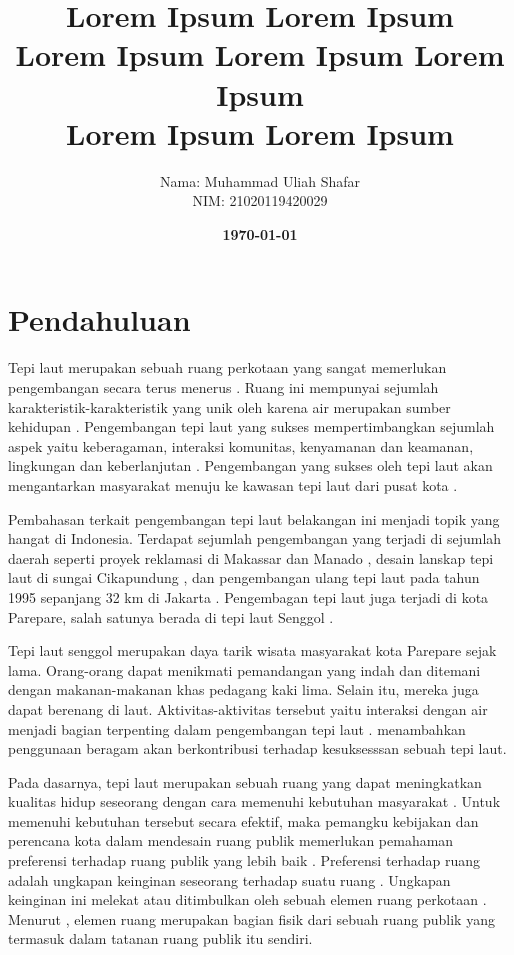 \documentclass[11pt]{simartadv} %
\title{
\textbf{Lorem Ipsum Lorem Ipsum \\
Lorem Ipsum Lorem Ipsum Lorem Ipsum} \\
\textbf{{Lorem Ipsum Lorem Ipsum \\}}
} %
\date{\textbf{\today}}
\author{
\begin{tabular}{@{}ll@{}}
	Nama & : Muhammad Uliah Shafar\\
	NIM & : 21020119420029\\
\end{tabular}
}
\begin{document}
\section{Pendahuluan}

Tepi laut merupakan sebuah ruang perkotaan yang sangat memerlukan pengembangan secara terus menerus \citep{shamsuddin2013}. Ruang ini mempunyai sejumlah karakteristik-karakteristik yang unik oleh karena air merupakan sumber kehidupan \citep{yassin2010}. Pengembangan tepi laut yang sukses mempertimbangkan sejumlah aspek yaitu keberagaman, interaksi komunitas, kenyamanan dan keamanan, lingkungan dan keberlanjutan \citep{hussein2014}. Pengembangan yang sukses oleh tepi laut akan mengantarkan masyarakat menuju ke kawasan tepi laut dari pusat kota \citep{hoyle2001}.

Pembahasan terkait pengembangan tepi laut belakangan ini menjadi topik yang hangat di Indonesia. Terdapat sejumlah pengembangan yang terjadi di sejumlah daerah seperti proyek reklamasi di Makassar dan Manado \citep{andi2017,fhuh2017,tungka2012}, desain lanskap tepi laut di sungai Cikapundung \citep{ainy2016}, dan pengembangan ulang tepi laut pada tahun 1995 sepanjang 32 km di Jakarta \citep{pramesti2017}. 
Pengembagan tepi laut juga terjadi di kota Parepare, salah satunya berada di tepi laut Senggol \citep{tri2020}.

Tepi laut senggol merupakan daya tarik wisata masyarakat kota Parepare sejak lama. Orang-orang dapat menikmati pemandangan yang indah dan ditemani dengan makanan-makanan khas pedagang kaki lima. Selain itu, mereka juga dapat berenang di laut. Aktivitas-aktivitas tersebut yaitu interaksi dengan air menjadi bagian terpenting dalam pengembangan tepi laut \citep{davidowich1998}. \cite{eldeeb2015} menambahkan penggunaan beragam akan berkontribusi terhadap kesuksesssan sebuah tepi laut.

Pada dasarnya, tepi laut merupakan sebuah ruang yang dapat meningkatkan kualitas hidup seseorang dengan cara memenuhi kebutuhan masyarakat \citep{kim2012}.
Untuk memenuhi kebutuhan tersebut secara efektif, maka pemangku kebijakan dan perencana kota dalam mendesain ruang publik memerlukan pemahaman preferensi terhadap ruang publik yang lebih baik \citep{madureira2018}.
Preferensi terhadap ruang adalah ungkapan keinginan seseorang terhadap suatu ruang \citep{zhang2006}. Ungkapan keinginan ini melekat atau ditimbulkan oleh sebuah elemen ruang perkotaan \citep{knox2014}. Menurut \cite{alves2008}, elemen ruang merupakan bagian fisik dari sebuah ruang publik yang termasuk dalam tatanan ruang publik itu sendiri.
\end{document}
